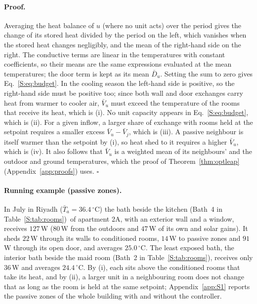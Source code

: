 \documentclass[10pt,a4paper,twocolumn]{article}
\theoremstyle{definition}
\newcommand{\pzTa}{36.4}
\newcommand{\pzIn}{127}
\newcommand{\pzOut}{80}
\newcommand{\pzGain}{47}
\newcommand{\pzCond}{22}
\newcommand{\pzPass}{14}
\newcommand{\pzDoor}{91}
\newcommand{\pzT}{25.0}
\newcommand{\pzInnIn}{36}
\newcommand{\pzInnT}{24.4}
\newcommand{\pzExpName}{bath beside the kitchen (Bath~4 in Table~\ref{S:tab:rooms})}
\newcommand{\pzInnName}{interior bath beside the maid room (Bath~2 in Table~\ref{S:tab:rooms})}
\begin{document}
\paragraph{Proof.} Averaging the heat balance of $u$ (where no unit acts) over the period gives the change of its stored heat divided by the period on the left, which vanishes when the stored heat changes negligibly, and the mean of the right-hand side on the right. The conductive terms are linear in the temperatures with constant coefficients, so their means are the same expressions evaluated at the mean temperatures; the door term is kept as its mean $\bar D_u$. Setting the sum to zero gives Eq.~\eqref{S:eq:budget}. In the cooling season the left-hand side is positive, so the right-hand side must be positive too; since both wall and door exchanges carry heat from warmer to cooler air, $\bar V_u$ must exceed the temperature of the rooms that receive its heat, which is (i). No unit capacity appears in Eq.~\eqref{S:eq:budget}, which is (ii). For a given inflow, a larger share of exchange with rooms held at the setpoint requires a smaller excess $\bar V_u-\bar V_j$, which is (iii). A passive neighbour is itself warmer than the setpoint by (i), so heat shed to it requires a higher $\bar V_u$, which is (iv). It also follows that $\bar V_u$ is a weighted mean of its neighbours' and the outdoor and ground temperatures, which the proof of Theorem~\ref{thm:optleap} (Appendix~\ref{app:proofs}) uses. $\square$

\paragraph{Running example (passive zones).} In July in Riyadh ($\bar T_a=\pzTa\,^{\circ}$C) the \pzExpName\ of apartment 2A, with an exterior wall and a window, receives $\pzIn\,$W ($\pzOut\,$W from the outdoors and $\pzGain\,$W of its own and solar gains). It sheds $\pzCond\,$W through its walls to conditioned rooms, $\pzPass\,$W to passive zones and $\pzDoor\,$W through its open door, and averages $\pzT\,^{\circ}$C. The least exposed bath, the \pzInnName, receives only $\pzInnIn\,$W and averages $\pzInnT\,^{\circ}$C. By (i), each sits above the conditioned rooms that take its heat, and by (ii), a larger unit in a neighbouring room does not change that as long as the room is held at the same setpoint; Appendix~\ref{app:S1} reports the passive zones of the whole building with and without the controller.
\end{document}
